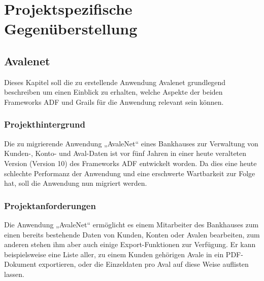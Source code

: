 \section{Projektspezifische Gegenüberstellung}
\subsection{Avalenet}
Dieses Kapitel soll die zu erstellende Anwendung Avalenet grundlegend beschreiben um einen Einblick zu erhalten, welche Aspekte der beiden Frameworks ADF und Grails für die Anwendung relevant sein können.
\subsubsection{Projekthintergrund}
Die zu migrierende Anwendung „AvaleNet“ eines Bankhauses zur Verwaltung von Kunden-, Konto- und Aval-Daten ist vor fünf Jahren in einer heute veralteten Version (Version 10) des Frameworks ADF entwickelt worden. Da dies eine heute schlechte Performanz der Anwendung und eine erschwerte Wartbarkeit zur Folge hat, soll die Anwendung nun migriert werden.
\subsubsection{Projektanforderungen}
Die Anwendung „AvaleNet“ ermöglicht es einem Mitarbeiter des Bankhauses zum einen bereits bestehende Daten von Kunden, Konten oder Avalen bearbeiten, zum anderen stehen ihm aber auch einige Export-Funktionen zur Verfügung. Er kann beispielsweise eine Liste aller, zu einem Kunden gehörigen Avale in ein PDF-Dokument exportieren, oder die Einzeldaten pro Aval auf diese Weise auflisten lassen.


